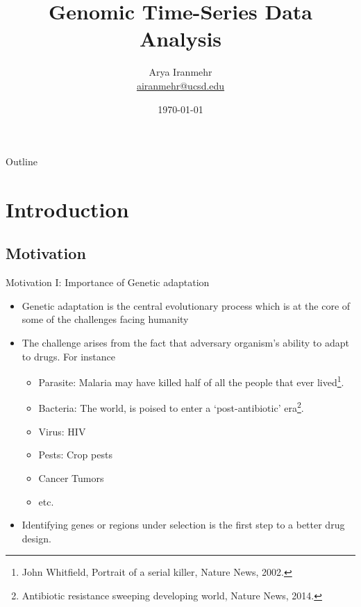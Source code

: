 \documentclass[t]{beamer} %
\title{Genomic Time-Series Data Analysis}
\subtitle{}
\author[Arya Iranmehr]
{%
  \texorpdfstring{
      \centering
      Arya Iranmehr\\
      \href{mailto:airanmehr@ucsd.edu}{airanmehr@ucsd.edu}
  }
  {Arya Iranmehr}
}
\institute{
Bafna's Lab\\
University of California, San Diego}
\date{
\monthyeardate\today}
\begin{document}
\begin{frame}
  \titlepage
\end{frame}
\begin{frame}{Outline}
  \tableofcontents
\end{frame}


\section{Introduction}
\subsection{Motivation}
\begin{frame}{Motivation I: Importance of  Genetic adaptation}
\begin{itemize}
\item Genetic adaptation is the central evolutionary process which is at the core of some of the challenges facing humanity
\item The challenge arises from the fact that adversary organism's ability to adapt to drugs. For instance
\begin{itemize}
\item Parasite: Malaria may have killed half of all the people that ever lived\footnote{John Whitfield, Portrait of a serial killer, Nature News, 2002.}.
\item Bacteria: The world, is poised to enter a ‘post-antibiotic’ era\footnote{Antibiotic resistance sweeping developing world, Nature News, 2014.}.
\item Virus: HIV
\item Pests: Crop pests
\item Cancer Tumors
\item etc.
\end{itemize}
\item Identifying genes or regions under selection is the first step to a better drug design.
\end{itemize}
\end{frame}
\end{document}
